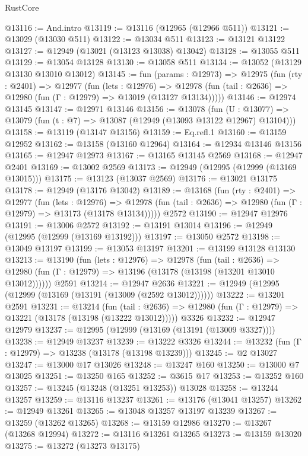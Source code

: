 \begin{lexlean}{RustCore}
\begin{coremodule}
@13116 := And.intro
@13119 := @13116 (@12965 (@12966 @511))
@13121 := @13029 (@13030 @511)
@13122 := @13034 @511
@13123 := @13121 @13122
@13127 := @12949 (@13021 (@13123 @13038) @13042)
@13128 := @13055 @511
@13129 := @13054 @13128
@13130 := @13058 @511
@13134 := @13052 (@13129 @13130 @13010 @13012)
@13145 := fun (params : @12973) =>
  @12975
    (fun (rty : @2401) =>
    @12977
      (fun (lets : @12976) =>
      @12978 (fun (tail : @2636) => @12980 (fun (Γ : @12979) => @13019 (@13127 @13134)))))
@13146 := @12974 @13145
@13147 := @12971 @13146
@13156 := @13078
    (fun (U : @13077) => @13079 (fun (t : @7) => @13087 (@12949 (@13093 @13122 @12967) @13104)))
@13158 := @13119 (@13147 @13156)
@13159 := Eq.refl.{1}
@13160 := @13159 @12952
@13162 := @13158 (@13160 @12964)
@13164 := @12934 @13146 @13156
@13165 := @12947 @12973
@13167 := @13165 @13145 @2569
@13168 := @12947 @2401
@13169 := @13002 @2569
@13173 := @12949 (@12995 (@12999 (@13169 @13015)))
@13175 := @13123 (@13037 @2569)
@13176 := @13021 @13175
@13178 := @12949 (@13176 @13042)
@13189 := @13168
    (fun (rty : @2401) =>
    @12977
      (fun (lets : @12976) =>
      @12978 (fun (tail : @2636) => @12980 (fun (Γ : @12979) => @13173 (@13178 @13134)))))
    @2572
@13190 := @12947 @12976
@13191 := @13006 @2572
@13192 := @13191 @13014
@13196 := @12949 (@12995 (@12999 (@13169 @13192)))
@13197 := @13050 @2572
@13198 := @13049 @13197
@13199 := @13053 @13197
@13201 := @13199 @13128 @13130
@13213 := @13190
    (fun (lets : @12976) =>
    @12978
      (fun (tail : @2636) =>
      @12980 (fun (Γ : @12979) => @13196 (@13178 (@13198 (@13201 @13010 @13012))))))
    @2591
@13214 := @12947 @2636
@13221 := @12949 (@12995 (@12999 (@13169 (@13191 (@13009 (@2592 @13012))))))
@13222 := @13201 @2591
@13231 := @13214
    (fun (tail : @2636) => @12980 (fun (Γ : @12979) => @13221 (@13178 (@13198 (@13222 @13012)))))
    @3326
@13232 := @12947 @12979
@13237 := @12995 (@12999 (@13169 (@13191 (@13009 @3327))))
@13238 := @12949 @13237
@13239 := @13222 @3326
@13244 := @13232 (fun (Γ : @12979) => @13238 (@13178 (@13198 @13239)))
@13245 := @2 @13027
@13247 := @13000 @17 @13026
@13248 := @13247 @160
@13250 := @13000 @7 @13025
@13251 := @13250 @165
@13252 := @3615 @17
@13253 := @13252 @160
@13257 := @13245 (@13248 (@13251 @13253)) @13028
@13258 := @13244 @13257
@13259 := @13116 @13237
@13261 := @13176 (@13041 @13257)
@13262 := @12949 @13261
@13265 := @13048 @13257 @13197 @13239
@13267 := @13259 (@13262 @13265)
@13268 := @13159 @12986
@13270 := @13267 (@13268 @12994)
@13272 := @13116 @13261 @13265
@13273 := @13159 @13020
@13275 := @13272 (@13273 @13175)

\end{coremodule}
\end{lexlean}
